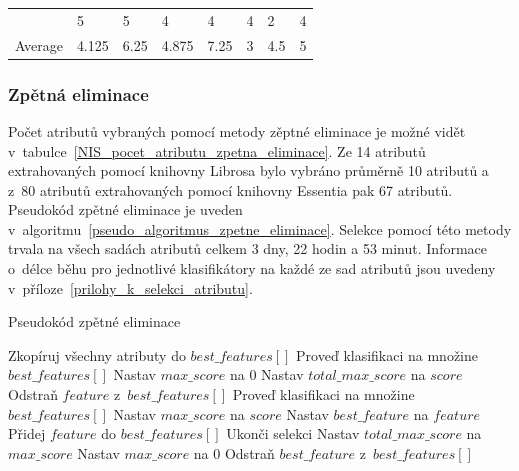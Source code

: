 \begin{table}[H]
{\begin{tabular}{llllllll}
    \rowcolor[HTML]{EFEFEF} 
    \multicolumn{1}{l|}{\cellcolor[HTML]{EFEFEF}XGBClassifier}          & 5       & 5                             & 4       & 4                             & 4       & 2                             & 4                         \\
    \multicolumn{1}{l|}{Average}                                        & 4.125   & 6.25                          & 4.875   & 7.25                          & 3       & 4.5                           & 5                        
    \end{tabular}}
\end{table}

\subsubsection*{Zpětná eliminace}
\label{NIS_zpetna_eliminace}
Počet atributů vybraných pomocí metody zěptné eliminace je možné vidět v~tabulce~\ref{NIS_pocet_atributu_zpetna_eliminace}. Ze 14 atributů extrahovaných pomocí knihovny Librosa bylo vybráno průměrně 10 atributů a z~80 atributů extrahovaných pomocí knihovny Essentia pak 67 atributů. Pseudokód zpětné eliminace je uveden v~algoritmu~\ref{pseudo_algoritmus_zpetne_eliminace}. Selekce pomocí této metody trvala na všech sadách atributů celkem 3 dny, 22 hodin a 53 minut. Informace o~délce běhu pro jednotlivé klasifikátory na každé ze sad atributů jsou uvedeny v~příloze~\ref{prilohy_k_selekci_atributu}.

\begin{algorithm}
    \caption{Pseudokód zpětné eliminace}
    \label{pseudo_algoritmus_zpetne_eliminace}
    \begin{algorithmic}[1]
        \State Zkopíruj všechny atributy do $best\_features[]$
        \State Proveď klasifikaci na množine $best\_features[]$
        \State Nastav $max\_score$ na $0$
        \State Nastav $total\_max\_score$ na $score$
                \State Odstraň $feature$ z~$best\_features[]$
                \State Proveď klasifikaci na množine $best\_features[]$
                    \State Nastav $max\_score$ na $score$
                    \State Nastav $best\_feature$ na $feature$
                \EndIf
                \State Přidej $feature$ do $best\_features[]$
            \EndFor
                \State Ukonči selekci
            \EndIf
            \State Nastav $total\_max\_score$ na $max\_score$
            \State Nastav $max\_score$ na $0$
            \State Odstraň $best\_feature$ z~$best\_features[]$
        \EndWhile
    \end{algorithmic}
\end{algorithm}

